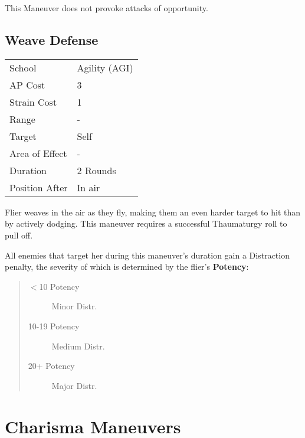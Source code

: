 \documentclass[11pt,a4paper,twocolumn]{book}
\begin{document}
This Maneuver does not provoke attacks of opportunity.

\bigskip

\subsection*{Weave Defense}
{
	\begin{tabu} to 75mm{| X[l,4] | X[l,7] |}
		\hline
		School         & Agility (AGI) \\
		AP Cost        & 3             \\
		Strain Cost    & 1             \\
		Range          & -             \\
		Target         & Self          \\
		Area of Effect & -             \\
		Duration       & 2 Rounds      \\
		Position After & In air        \\ \hline
	\end{tabu}
	
}

\medskip

Flier weaves in the air as they fly, making them an even harder target to hit than by actively dodging. This maneuver requires a successful Thaumaturgy roll to pull off.

All enemies that target her during this maneuver's duration gain a Distraction penalty, the severity of which is determined by the flier's \textbf{Potency}:

\begin{quote}
	\begin{description}
		\item[$<$10 Potency] 	Minor Distr.
		\item[10-19 Potency] 	Medium Distr.
		\item[20+ Potency] 	Major Distr.
	\end{description}
\end{quote}

\vfill


\section*{Charisma Maneuvers} 
\end{document}
